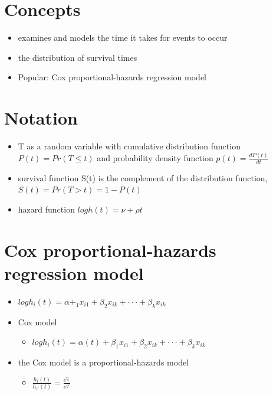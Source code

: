 \documentclass[]{book}
\providecommand{\tightlist}{%
  \setlength{\itemsep}{0pt}\setlength{\parskip}{0pt}}
\begin{document}
\hypertarget{concepts}{%
\section{Concepts}\label{concepts}}

\begin{itemize}
\tightlist
\item
  examines and models the time it takes for events to occur
\item
  the distribution of survival times
\item
  Popular: Cox proportional-hazards regression model
\end{itemize}

\hypertarget{notation}{%
\section{Notation}\label{notation}}

\begin{itemize}
\tightlist
\item
  T as a random variable with cumulative distribution function \(P (t) = Pr(T ≤ t)\) and probability density function \(p(t) = \frac{dP (t)}{dt}\)
\item
  survival function S(t) is the complement of the distribution function, \(S(t) = Pr(T > t) = 1 − P (t)\)
\item
  hazard function \(log h(t) = ν + ρt\)
\end{itemize}

\hypertarget{cox-proportional-hazards-regression-model}{%
\section{Cox proportional-hazards regression model}\label{cox-proportional-hazards-regression-model}}

\begin{itemize}
\tightlist
\item
  \(log h_i(t)=α+_1x_{i1} +β_2x_{ik} +···+β_kx_{ik}\)
\item
  Cox model

  \begin{itemize}
  \tightlist
  \item
    \(log h_i(t)=α(t)+β_1x_{i1} +β_2x_{ik} +···+β_kx_{ik}\)
  \end{itemize}
\item
  the Cox model is a proportional-hazards model

  \begin{itemize}
  \tightlist
  \item
    \(\frac{h_i(t)}{h_{i'}(t)} = \frac{e^{\eta_i}}{e^{\eta'}}\)
  \end{itemize}
\end{itemize}
\end{document}
